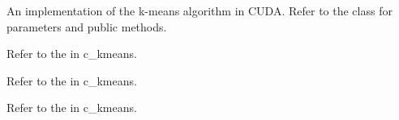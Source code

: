 \documentclass[letterpaper,10pt,english]{sphinxmanual}
\begin{document}
\begin{fulllineitems}
\label{kmeans:spscicomp.kmeans.extension.c_kmeans.cuda.cuda_kmeans.CUDAKmeans}
An implementation of the k-means algorithm in CUDA. Refer to the {\hyperref[kmeans:kmeans.DefaultKmeans]{}} class for parameters and
public methods.

\end{fulllineitems}


\begin{fulllineitems}
Refer to the {\hyperref[kmeans:c.cal_chunk_centers]{}} in c\_kmeans.

\end{fulllineitems}


\begin{fulllineitems}
\label{kmeans:c.initkmeans_c_extension_cuda}
Refer to the {\hyperref[kmeans:c.initkmeans_c_extension]{}} in c\_kmeans.

\end{fulllineitems}


\begin{fulllineitems}
Refer to the  in c\_kmeans.

\end{fulllineitems}

\end{document}
